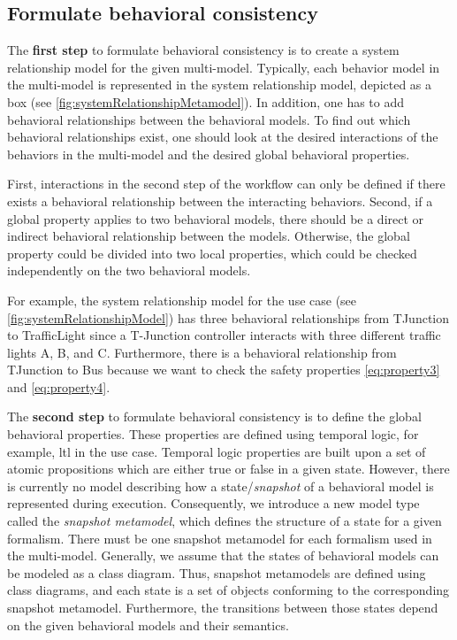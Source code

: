 \documentclass{jot}
\begin{document}
\subsection{Formulate behavioral consistency}
The \textbf{first step} to formulate behavioral consistency is to create a system relationship model for the given multi-model.
Typically, each behavior model in the multi-model is represented in the system relationship model, depicted as a box (see \autoref{fig:systemRelationshipMetamodel}).
In addition, one has to add behavioral relationships between the behavioral models.
To find out which behavioral relationships exist, one should look at the desired interactions of the behaviors in the multi-model and the desired global behavioral properties.

First, interactions in the second step of the workflow can only be defined if there exists a behavioral relationship between the interacting behaviors.
Second, if a global property applies to two behavioral models, there should be a direct or indirect behavioral relationship between the models.
Otherwise, the global property could be divided into two local properties, which could be checked independently on the two behavioral models.

For example, the system relationship model for the use case (see \autoref{fig:systemRelationshipModel}) has three behavioral relationships from \textsf{TJunction} to \textsf{TrafficLight} since a T-Junction controller interacts with three different traffic lights A, B, and C.
Furthermore, there is a behavioral relationship from \textsf{TJunction} to \textsf{Bus} because we want to check the safety properties \ref{eq:property3} and \ref{eq:property4}. 

The \textbf{second step} to formulate behavioral consistency is to define the global behavioral properties.
These properties are defined using temporal logic, for example, \gls*{ltl} in the use case.
Temporal logic properties are built upon a set of atomic propositions which are either true or false in a given state.
However, there is currently no model describing how a state/\emph{snapshot} of a behavioral model is represented during execution.
Consequently, we introduce a new model type called the \emph{snapshot metamodel}, which defines the structure of a state for a given formalism.
There must be one snapshot metamodel for each formalism used in the multi-model.
Generally, we assume that the states of behavioral models can be modeled as a class diagram.
Thus, snapshot metamodels are defined using class diagrams, and each state is a set of objects conforming to the corresponding snapshot metamodel.
Furthermore, the transitions between those states depend on the given behavioral models and their semantics.
\end{document}
